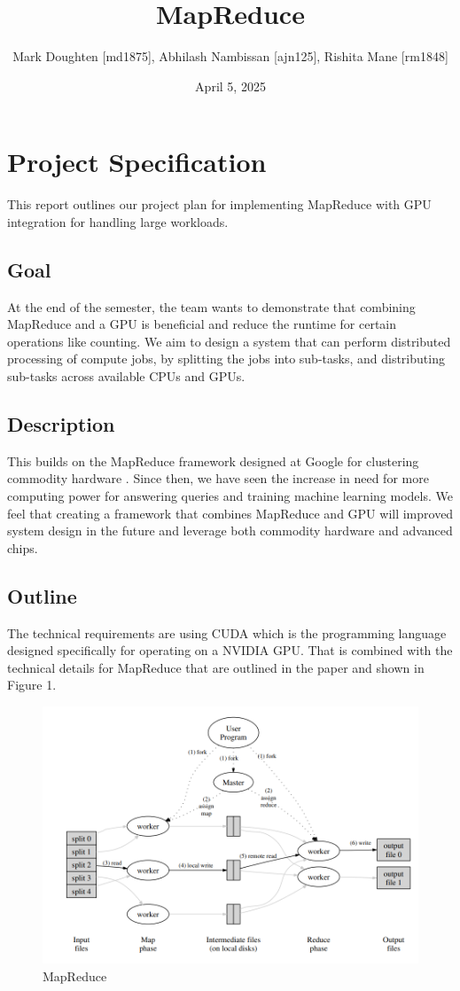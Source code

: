 \documentclass{article}
\title{MapReduce}
\author{Mark Doughten [md1875], Abhilash Nambissan [ajn125], Rishita Mane [rm1848]}
\date{April 5, 2025}
\begin{document}
\maketitle
\section{Project Specification}

This report outlines our project plan for implementing MapReduce with GPU integration for handling large workloads.

\subsection{Goal}
At the end of the semester, the team wants to demonstrate that combining MapReduce and a GPU is beneficial and reduce the runtime for certain operations like counting. We aim to design a system that can perform distributed processing of compute jobs, by splitting the jobs into sub-tasks, and distributing sub-tasks across available CPUs and GPUs.

\subsection{Description}
This builds on the MapReduce framework designed at Google for clustering commodity hardware \cite{mapreduce}. Since then, we have seen the increase in need for more computing power for answering queries and training machine learning models. We feel that creating a framework that combines MapReduce and GPU will improved system design in the future and leverage both commodity hardware and advanced chips. 

\subsection{Outline}
The technical requirements are using CUDA which is the programming language designed specifically for operating on a NVIDIA GPU. That is combined with the technical details for MapReduce that are outlined in the paper \cite{mapreduce} and shown in Figure 1. 

\begin{figure}[ht]
    \centering
    \includegraphics[width=1\linewidth]{./images/mapreduce.png}
    \caption{MapReduce \cite{mapreduce}}
    \label{fig:chroot}
\end{figure}
\end{document}
